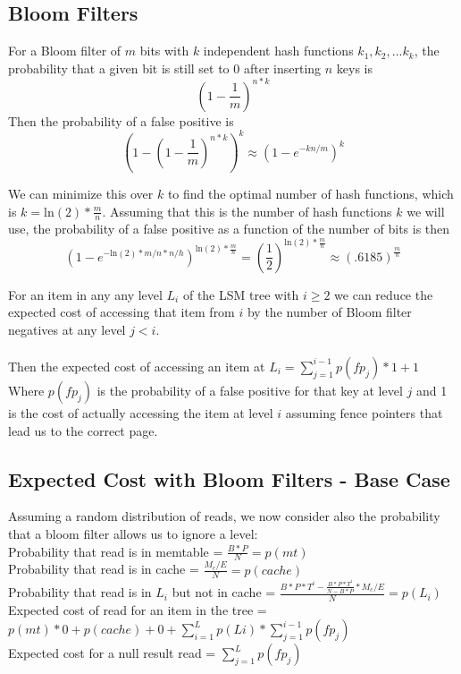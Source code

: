 \documentclass[11pt]{article}
\theoremstyle{plain}
\theoremstyle{definition}
\begin{document}
\subsection{Bloom Filters}

For a Bloom filter of $m$ bits with $k$ independent hash functions $k_1, k_2,...k_k$, the probability that a given bit is still set to 0 after inserting $n$ keys is 
$$
(1 - \frac{1}{m})^{n*k}
$$
Then the probability of a false positive is 
$$
(1- (1 - \frac{1}{m})^{n*k})^k \approx (1 - e^{-kn/m})^k
$$

We can minimize this over $k$ to find the optimal number of hash functions, which is $k = \mathrm{ln}(2) * \frac{m}{n}$. Assuming that this is the number of hash functions $k$ we will use, the probability of a false positive as a function of the number of bits is then 
$$
(1 - e^{-\mathrm{ln}(2)*m/n*n/h})^{\mathrm{ln}(2) * \frac{m}{n}} = (\frac{1}{2}) ^ {\mathrm{ln}(2) * \frac{m}{n}} \approx (.6185) ^  {\frac{m}{n}}
$$

For an item in any any level $L_i$ of the LSM tree with $i \geq 2$ we can reduce the expected cost of accessing that item from $i$ by the number of Bloom filter negatives at any level $j<i$. \\ \\
Then the expected cost of accessing an item at $L_i =  \sum_{j=1}^{i-1} p(fp_j) * 1 + 1$
Where $p(fp_j)$ is the probability of a false positive for that key at level $j$ and 1 is the cost of actually accessing the item at level $i$ assuming fence pointers that lead us to the correct page.

\subsection{Expected Cost with Bloom Filters - Base Case}

Assuming a random distribution of reads, we now consider also the probability that a bloom filter allows us to ignore a level: \\
Probability that read is in memtable = $\frac{B*P}{N}  = p(mt)$\\
Probability that read is in cache = $\frac{M_c/E}{N} = p(cache)$ \\

Probability that read is in $L_i$ but not in cache = $ \frac{B*P*T^i - \frac{B*P*T^i}{N-B*P} * M_c/E}{N}  = p(L_i)$\\

Expected cost of read for an item in the tree = $p(mt) * 0  + p(cache) + 0 + \sum_{i=1}^L p(Li) * \sum_{j=1}^{i-1} p(fp_j)$ \\
Expected cost for a null result read = $\sum_{j=1}^{L} p(fp_j)$
\end{document}
